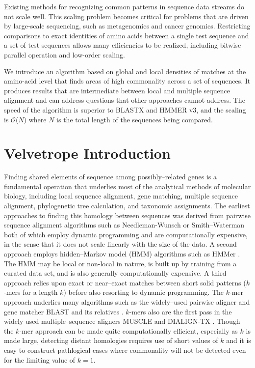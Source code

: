 \documentclass[phd,tocprelim]{cornell}
\begin{document}
Existing methods for recognizing common patterns in sequence data
streams do not scale well. This scaling problem becomes critical for
problems that are driven by large-scale sequencing, such as
metagenomics and cancer genomics.  Restricting comparisons to exact
identities of amino acids between a single test sequence and a set of
test sequences allows many efficiencies to be realized, including
bitwise parallel operation and low-order scaling.

We introduce an algorithm based on global and local densities of
matches at the amino-acid level that finds areas of high commonality
across a set of sequences.  It produces results that are intermediate
between local and multiple sequence alignment and can address
questions that other approaches cannot address.  The speed of the
algorithm is superior to BLASTX and HMMER v3, and the scaling is
$\mathcal O$($N$) where $N$ is the total length of the sequences
being compared.

\chapter{Velvetrope Introduction} %
\label{cha:Velvetrope Introduction}

Finding shared elements of sequence among possibly--related genes is a
fundamental operation that underlies most of the analytical methods of
molecular biology, including local sequence alignment, gene matching,
multiple sequence alignment, phylogenetic tree calculation, and
taxonomic assignments. The earliest approaches to finding this homology
between sequences was derived from pairwise sequence alignment algorithms
such as Needleman-Wunsch \cite{Needleman70} or Smith--Waterman
\cite{SmithWaterman} both of which employ dynamic programming and
are computationally expensive, in the sense that it does not scale linearly with the size of the data. A second approach employs
hidden--Markov model (HMM) algorithms such as HMMer
\cite{Eddy98}. The HMM may be local or non-local in nature, is
built up by training from a curated data set, and is also generally
computationally expensive. A third approach relies upon exact or
near--exact matches between short solid patterns ($k$-mers for a length $k$) before also resorting to dynamic programming.  The
$k$-mer approach underlies many algorithms such as the widely--used
pairwise aligner and gene matcher BLAST \cite{BLAST} and its
relatives \cite{BLAT,Megablast,PSIBLAST}. $k$-mers also are the first pass in the widely used multiple--sequence aligners
MUSCLE \cite{MUSCLE} and DIALIGN-TX \cite{DIALIGN-TX}. Though the $k$-mer approach can be made quite computationally
efficient, especially as $k$ is made large, detecting distant
homologies requires use of short values of $k$ and it is easy to
construct pathlogical cases where commonality will not be detected
even for the limiting value of $k = 1$.
\end{document}
